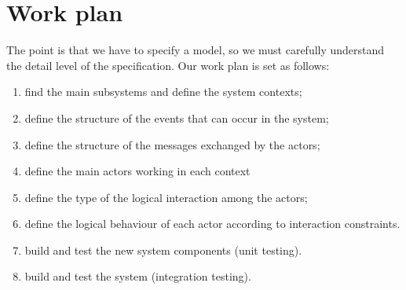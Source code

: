 \section{Work plan}
The point is that we have to specify a model, so we must carefully understand the detail level of the specification.
Our work plan is set as follows:
\begin{enumerate}
	\item find the main subsystems and define the system contexts;
	\item define the structure of the events that can occur in the system;
	\item define the structure of the messages exchanged by the actors;
	\item define the main actors working in each context
	\item define the type of the logical interaction among the actors;
	\item define the logical behaviour of each actor according to interaction constraints.
	\item build and test the new system components (unit testing).
	\item build and test the system (integration testing).
\end{enumerate}